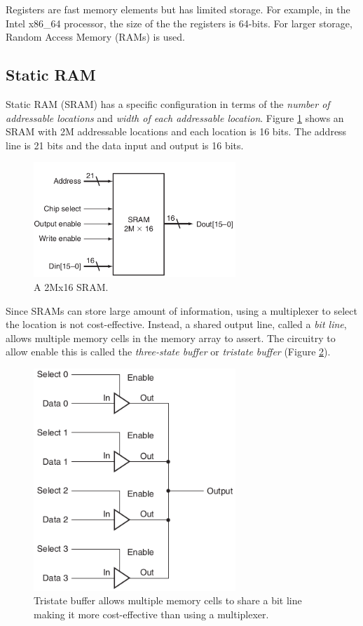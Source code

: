 \documentclass[a4paper, 11pt,oneside]{article}
\begin{document}
Registers are fast memory elements but has limited storage. For example, in the 
Intel x86\_64 processor, the size of the the registers is 64-bits. For larger 
storage, Random Access Memory (RAMs) is used. 


\subsection{Static RAM}
Static RAM (SRAM) has a specific configuration in terms of the \textit{number 
of 
addressable locations} and \textit{width of each addressable location}. Figure 
\ref{fig:sram0} shows an SRAM with 2M addressable locations and each
location is 16 bits. The address line is 21 bits and the data input and output 
is 16 bits.

\begin{figure}[H]
	\begin{center}
	\includegraphics[width=3in]{sram0.png}
	\caption{A 2Mx16 SRAM.}
	\label{fig:sram0} 
	\end{center}
\end{figure}

Since SRAMs can store large amount of information, using a multiplexer to 
select the location is not cost-effective. Instead, a shared output line, called
a \textit{bit line}, allows multiple memory cells in the memory array to
assert. The circuitry to allow enable this is called the 
\textit{three-state buffer} or \textit{tristate buffer} 
(Figure \ref{fig:sram1}).

\begin{figure}[H]
	\begin{center}
	\includegraphics[width=3in]{sram1.png}
	\caption{Tristate buffer allows multiple memory cells to share a bit line 
	making it more cost-effective than using a multiplexer.}
	\label{fig:sram1} 
	\end{center}
\end{figure}
\end{document}
